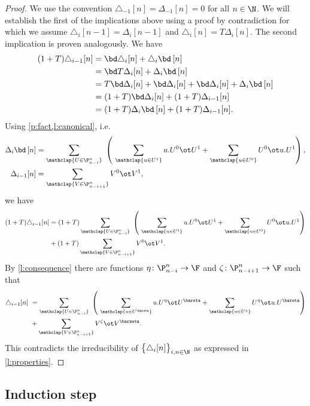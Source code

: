 \begin{proof}
	We use the convention $\triangle_{-1} [n] = \Delta_{-1} [n] = 0$ for all $n \in \N$.
	We will establish the first of the implications above using a proof by contradiction for which we assume $\triangle_i [n-1] = \Delta_i [n-1]$ and $\triangle_i [n] = T \Delta_i [n]$.
	The second implication is proven analogously.
	We have
	\begin{align*}
	(1+T) \triangle_{i-1}[n] &=
	\bd \triangle_i [n] + \triangle_i \bd \, [n] \\ &=
	\bd T \Delta_i [n] + \Delta_i \bd \, [n] \\ &=
	T \bd \Delta_i [n] + \bd \Delta_i [n] + \bd \Delta_i [n] + \Delta_i \bd \, [n] \\ &=
	(1+T) \bd \Delta_i [n] + (1+T) \Delta_{i-1} [n] \\ &=
	(1+T) \Delta_i \bd \, [n] + (1+T) \Delta_{i-1} [n].
	\end{align*}
	Using \cref{p:fact,l:canonical}, i.e.
	\[
	\begin{split}
	\Delta_i \bd \, [n] &=
	\sum_{\mathclap{U \in \P_{n-i}^n}} \
	\left(\
	\sum_{\mathclap{u \in U^1}} u.U^0 \ot U^1 +
	\sum_{\mathclap{u \in U^0}} U^0 \ot u.U^1
	\right), \\
	\Delta_{i-1} [n] &=
	\sum_{\mathclap{V \in \P_{n-i+1}^n}} V^0 \ot V^1,
	\end{split}
	\]
	we have
	\begin{align*}
	(1+T) \triangle_{i-1}[n] &=
	(1+T) \sum_{\mathclap{U \in \P_{n-i}^n}} \
	\left(\
	\sum_{\mathclap{u \in U^1}} u.U^0 \ot U^1 +
	\sum_{\mathclap{u \in U^0}} U^0 \ot u.U^1
	\right) \\ &+
	(1+T) \sum_{\mathclap{V \in \P_{n-i+1}^n}} V^0 \ot V^1.
	\end{align*}
	By \cref{l:consequence} there are functions $\eta \colon \P_{n-i}^n \to \F$ and $\zeta \colon \P_{n-i+1}^n \to \F$ such that
	\begin{align*}
	\triangle_{i-1}[n] \ &=
	\sum_{\mathclap{U \in \P_{n-i}^n}} \
	\left(\
	\sum_{\mathclap{u \in U^\bareta}} u.U^\eta \ot U^\bareta +
	\sum_{\mathclap{u \in U^\eta}} U^\eta \ot u.U^\bareta
	\right) \\ &+
	\sum_{\mathclap{V \in \P_{n-i+1}^n}} V^\zeta \ot V^\barzeta.
	\end{align*}
	This contradicts the irreducibility of $\big\{ \triangle_i [n] \big\}_{i,n \in \N}$ as expressed in \cref{l:properties}.
\end{proof}

\subsection{Induction step}\label{ss:step}

